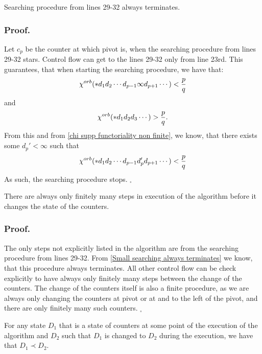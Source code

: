 \begin{lemma}\label{Small searching always terminates}
Searching procedure from lines 29-32 always terminates.
\end{lemma}
\subsubsection{Proof.}
Let $c_p$ be the counter at which pivot is, when the searching procedure from lines 
29-32 stars. Control flow can get to the lines 29-32 only from line 23rd. This guarantees, that 
when starting the searching procedure, we have that:
\begin{equation}
{\chi^{orb}(*d_1d_2\cdots d_{p-1}\infty d_{p+1}\cdots)} < \frac{p}{q}
\end{equation}
and  
\begin{equation}
{\chi^{orb}(*d_1d_2d_3\cdots )} > \frac{p}{q}.
\end{equation}
From this and from \ref{chi supp functoriality non finite}, 
we know, that there exists some $d_p' < \infty$ such that 
\begin{equation}
{\chi^{orb}(*d_1d_2\cdots d_{p-1}d_p' d_{p+1}\cdots)} < \frac{p}{q}
\end{equation}
As such, the searching procedure stops. $_\square$
\begin{lemma}\label{finitely many steps between counter changes}
There are always only finitely many steps in execution of the algorithm before it 
changes the state of the counters. 
\end{lemma}
\subsubsection{Proof.}
The only steps not explicitly listed in the algorithm are from the searching procedure from lines 
29-32. From \ref{Small searching always terminates} we know, that this procedure 
always terminates. 
All other control flow can be check explicitly to have always only finitely many steps between 
the change of the counters. 
The change of the counters itself is also a finite procedure, as we are always only changing 
the counters at pivot or at and to the left of the pivot, and there are only finitely many 
such counters. $_\square$
\begin{lemma}\label{always increases}
For any state $D_1$ that is a state of counters at some point of the execution of the algorithm 
and $D_2$ such that $D_1$ is changed to $D_2$ during the execution, we have that $D_1 \prec D_2$.
\end{lemma}

